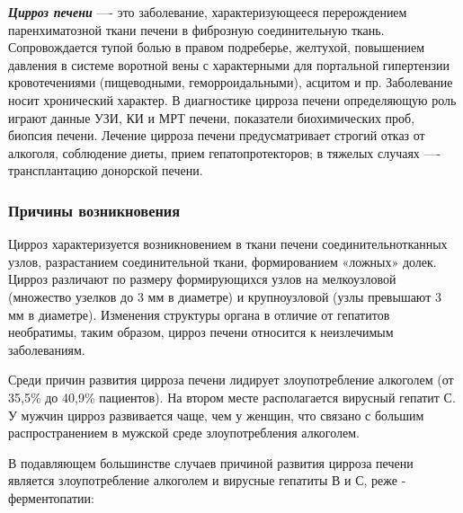 \documentclass[
  11pt,
]{article}
\begin{document}
\textbf{\emph{Цирроз печени}} ---- это заболевание, характеризующееся
перерождением паренхиматозной ткани печени в фиброзную соединительную
ткань. Сопровождается тупой болью в правом подреберье, желтухой,
повышением давления в системе воротной вены с характерными для
портальной гипертензии кровотечениями (пищеводными, геморроидальными),
асцитом и пр. Заболевание носит хронический характер. В диагностике
цирроза печени определяющую роль играют данные УЗИ, КИ и МРТ печени,
показатели биохимических проб, биопсия печени. Лечение цирроза печени
предусматривает строгий отказ от алкоголя, соблюдение диеты, прием
гепатопротекторов; в тяжелых случаях ---- трансплантацию донорской
печени.

\hypertarget{ux43fux440ux438ux447ux438ux43dux44b-ux432ux43eux437ux43dux438ux43aux43dux43eux432ux435ux43dux438ux44f}{%
\subsubsection{Причины
возникновения}\label{ux43fux440ux438ux447ux438ux43dux44b-ux432ux43eux437ux43dux438ux43aux43dux43eux432ux435ux43dux438ux44f}}

Цирроз характеризуется возникновением в ткани печени
соединительнотканных узлов, разрастанием соединительной ткани,
формированием «ложных» долек. Цирроз различают по размеру формирующихся
узлов на мелкоузловой (множество узелков до 3 мм в диаметре) и
крупноузловой (узлы превышают 3 мм в диаметре). Изменения структуры
органа в отличие от гепатитов необратимы, таким образом, цирроз печени
относится к неизлечимым заболеваниям.

Среди причин развития цирроза печени лидирует злоупотребление алкоголем
(от 35,5\% до 40,9\% пациентов). На втором месте располагается вирусный
гепатит С. У мужчин цирроз развивается чаще, чем у женщин, что связано с
большим распространением в мужской среде злоупотребления алкоголем.

В подавляющем большинстве случаев причиной развития цирроза печени
является злоупотребление алкоголем и вирусные гепатиты В и С, реже -
ферментопатии:
\end{document}
